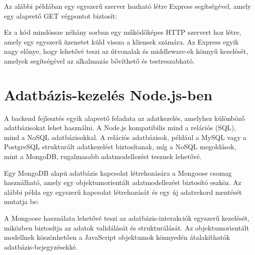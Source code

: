 \documentclass[
]{thesis-ekf}
\theoremstyle{definition}
\theoremstyle{remark}
\begin{document}
Az alábbi példában egy egyszerű szerver hozható létre Express segítségével, amely egy alapvető GET végpontot biztosít:

%

Ez a kód mindössze néhány sorban egy működőképes HTTP szervert hoz létre, amely egy egyszerű üzenetet küld vissza a kliensek számára. Az Express egyik nagy előnye, hogy lehetővé teszi az útvonalak és middleware-ek könnyű kezelését, amelyek segítségével az alkalmazás bővíthető és testreszabható.

\section{Adatbázis-kezelés Node.js-ben}

A backend fejlesztés egyik alapvető feladata az adatkezelés, amelyhez különböző adatbázisokat lehet használni. A Node.js kompatibilis mind a relációs (SQL), mind a NoSQL adatbázisokkal. A relációs adatbázisok, például a MySQL vagy a PostgreSQL strukturált adatkezelést biztosítanak, míg a NoSQL megoldások, mint a MongoDB, rugalmasabb adatmodellezést tesznek lehetővé.

Egy MongoDB alapú adatbázis kapcsolat létrehozására a Mongoose csomag használható, amely egy objektumorientált adatmodellezést biztosító eszköz. Az alábbi példa egy egyszerű kapcsolat létrehozását és egy új adatrekord mentését mutatja be:

%

A Mongoose használata lehetővé teszi az adatbázis-interakciók egyszerű kezelését, miközben biztosítja az adatok validálását és strukturálását. Az objektumorientált modellnek köszönhetően a JavaScript objektumok könnyedén átalakíthatók adatbázis-bejegyzésekké.
	
\end{document}
